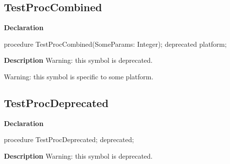 \documentclass{report}
\begin{document}
\subsection*{TestProcCombined}
\begin{list}{}{
\setlength{\itemindent}{0cm}
\setlength{\listparindent}{0cm}
\setlength{\leftmargin}{\evensidemargin}
\addtolength{\leftmargin}{\tmplength}
\settowidth{\labelsep}{X}
\addtolength{\leftmargin}{\labelsep}
\setlength{\labelwidth}{\tmplength}
}
\begin{flushleft}
\item[\textbf{Declaration}\hfill]
\begin{ttfamily}
procedure TestProcCombined(SomeParams: Integer); deprecated  platform;\end{ttfamily}


\end{flushleft}
\par
\item[\textbf{Description}]
Warning: this symbol is deprecated.

Warning: this symbol is specific to some platform.

 

\end{list}
\subsection*{TestProcDeprecated}
\begin{list}{}{
\setlength{\itemindent}{0cm}
\setlength{\listparindent}{0cm}
\setlength{\leftmargin}{\evensidemargin}
\addtolength{\leftmargin}{\tmplength}
\settowidth{\labelsep}{X}
\addtolength{\leftmargin}{\labelsep}
\setlength{\labelwidth}{\tmplength}
}
\begin{flushleft}
\item[\textbf{Declaration}\hfill]
\begin{ttfamily}
procedure TestProcDeprecated; deprecated;\end{ttfamily}


\end{flushleft}
\par
\item[\textbf{Description}]
Warning: this symbol is deprecated.

 

\end{list}
\end{document}
